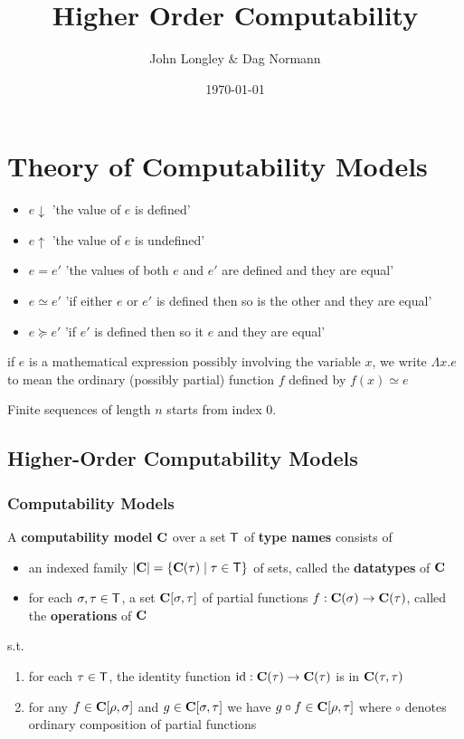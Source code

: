 \documentclass[11pt]{article}
\author{John Longley \& Dag Normann}
\date{\today}
\title{Higher Order Computability}
\begin{document}
\maketitle
\tableofcontents


\section{Theory of Computability Models}
\label{sec:org22ccaad}
\begin{itemize}
\item \(e\downarrow\) 'the value of \(e\) is defined'
\item \(e\uparrow\) 'the value of \(e\) is undefined'
\item \(e=e'\) 'the values of both \(e\) and \(e'\) are defined and they are equal'
\item \(e\simeq e'\) 'if either \(e\) or \(e'\) is defined then so is the other and they are equal'
\item \(e\succeq e'\) 'if \(e'\) is defined then so it \(e\) and they are equal'
\end{itemize}


if \(e\) is a mathematical expression possibly involving the variable \(x\), we write \(\Lambda x.e\)
to mean the ordinary (possibly partial) function \(f\) defined by \(f(x)\simeq e\)

Finite sequences of length \(n\) starts from index 0.
\subsection{Higher-Order Computability Models}
\label{sec:org2f4792b}
\subsubsection{Computability Models}
\label{sec:org0d3a3eb}
\begin{definition}[]
A \textbf{computability model} \(\operatorname{\textbf{C}}\)  over a set \(\textsf{T}\) of \textbf{type names} consists of
\begin{itemize}
\item an indexed family \(\abs{\bC}=\{\bC(\tau)\mid\tau\in\sfT\}\) of sets, called the \textbf{datatypes} of \(\operatorname{\textbf{C}}\)
\item for each \(\sigma,\tau\in\textsf{T}\), a set \(\operatorname{\textbf{C}}[\sigma,\tau]\) of partial functions \(f:\operatorname{\textbf{C}}(\sigma)\to\operatorname{\textbf{C}}(\tau)\), called the
\textbf{operations} of \(\operatorname{\textbf{C}}\)
\end{itemize}


s.t.
\begin{enumerate}
\item for each \(\tau\in\textsf{T}\), the identity function \(\operatorname{id}:\operatorname{\textbf{C}}(\tau)\to\operatorname{\textbf{C}}(\tau)\) is in \(\operatorname{\textbf{C}}(\tau,\tau)\)
\item for any \(f\in\operatorname{\textbf{C}}[\rho,\sigma]\) and \(g\in\operatorname{\textbf{C}}[\sigma,\tau]\) we have \(g\circ f\in\operatorname{\textbf{C}}[\rho,\tau]\) where \(\circ\) denotes ordinary
composition of partial functions
\end{enumerate}
\end{definition}
\end{document}
